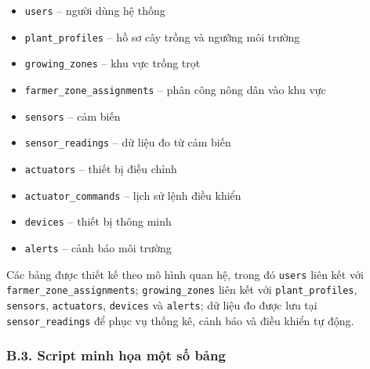 \documentclass[13pt,a4paper]{extarticle}
\numberwithin{figure}{section}
\numberwithin{table}{section}
\begin{document}
	\begin{itemize}
		\item \texttt{users} -- người dùng hệ thống
		\item \texttt{plant\_profiles} -- hồ sơ cây trồng và ngưỡng môi trường
		\item \texttt{growing\_zones} -- khu vực trồng trọt
		\item \texttt{farmer\_zone\_assignments} -- phân công nông dân vào khu vực
		\item \texttt{sensors} -- cảm biến
		\item \texttt{sensor\_readings} -- dữ liệu đo từ cảm biến
		\item \texttt{actuators} -- thiết bị điều chỉnh
		\item \texttt{actuator\_commands} -- lịch sử lệnh điều khiển
		\item \texttt{devices} -- thiết bị thông minh
		\item \texttt{alerts} -- cảnh báo môi trường
	\end{itemize}
	
	Các bảng được thiết kế theo mô hình quan hệ, trong đó \texttt{users} liên kết với \texttt{farmer\_zone\_assignments}; \texttt{growing\_zones} liên kết với \texttt{plant\_profiles}, \texttt{sensors}, \texttt{actuators}, \texttt{devices} và \texttt{alerts}; dữ liệu đo được lưu tại \texttt{sensor\_readings} để phục vụ thống kê, cảnh báo và điều khiển tự động.
	
	\subsubsection*{B.3. Script minh họa một số bảng}
	
\end{document}
